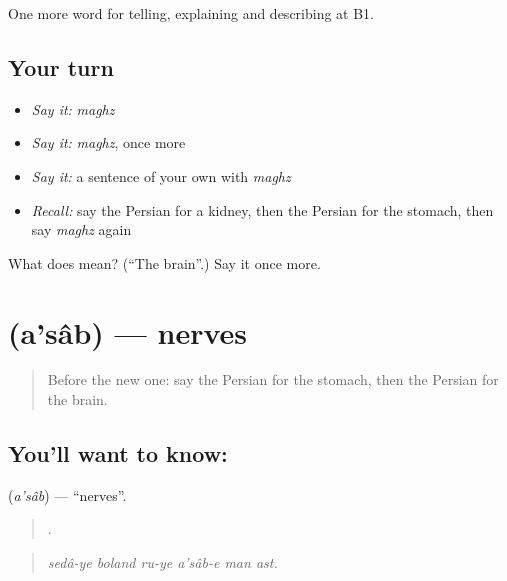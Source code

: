 \begin{grammarlens}[title={What you've built}]
One more word for telling, explaining and describing at B1.
\end{grammarlens}

\subsection*{Your turn}
\begin{itemize}
\raggedright
  \item \emph{Say it:} \emph{maghz}
  \item \emph{Say it:} \emph{maghz}, once more
  \item \emph{Say it:} a sentence of your own with \emph{maghz}
  \item \emph{Recall:} say the Persian for a kidney, then the Persian for the stomach, then say \emph{maghz} again
\end{itemize}

\begin{tcolorbox}[breakable,colback=teal!4,colframe=teal!35!black,title={Before you move on}]
What does  mean? (\textquotedblleft{}The brain\textquotedblright{}.) Say it once more.
\end{tcolorbox}
\section[\texorpdfstring{\fa{اعصاب} (a'sâb)}{اعصاب (a'sâb)}]{ (a'sâb) — nerves}

\label{lesson:FA-C496-asab}



\begin{quote}
Before the new one: say the Persian for the stomach, then the Persian for the brain.
\end{quote}

\subsection*{You'll want to know: }
\textbf{} (\emph{a'sâb}) — \textquotedblleft{}nerves\textquotedblright{}.

\begin{quote}
     .
\end{quote}

\begin{quote}
\emph{sedâ-ye boland ru-ye a'sâb-e man ast.}
\end{quote}

